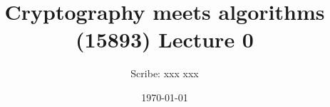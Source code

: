 \documentclass[11pt]{article}
\title{Cryptography meets algorithms (15893) Lecture 0}
\author{Scribe: xxx xxx}
\date{\today}
\begin{document}
\maketitle


{

}



\end{document}
